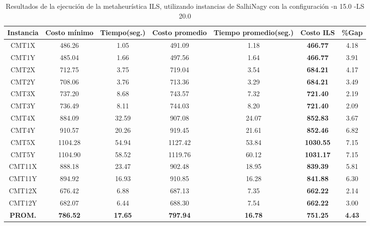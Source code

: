 \begin{table}[ht]
\caption{Resultados de la ejecución de la metaheurística ILS, utilizando instancias de SalhiNagy con la configuración -n 15.0 -LS 20.0}
\centering
\small
\begin{tabular}{c c c c c c c}
\hline\hline
Instancia & Costo mínimo & Tiempo(seg.) & Costo promedio & Tiempo promedio(seg.) & Costo ILS & \%Gap \\ [0.5ex]
\hline
CMT1X & 486.26 & 1.05 & 
491.09 & 1.18 & \bf{466.77} & 
4.18\\CMT1Y & 485.04 & 1.66 & 
497.56 & 1.64 & \bf{466.77} & 
3.91\\CMT2X & 712.75 & 3.75 & 
719.04 & 3.54 & \bf{684.21} & 
4.17\\CMT2Y & 708.06 & 3.76 & 
713.36 & 3.29 & \bf{684.21} & 
3.49\\CMT3X & 737.20 & 8.68 & 
743.57 & 7.32 & \bf{721.40} & 
2.19\\CMT3Y & 736.49 & 8.11 & 
744.03 & 8.20 & \bf{721.40} & 
2.09\\CMT4X & 884.09 & 32.59 & 
907.08 & 24.07 & \bf{852.83} & 
3.67\\CMT4Y & 910.57 & 20.26 & 
919.45 & 21.61 & \bf{852.46} & 
6.82\\CMT5X & 1104.28 & 54.94 & 
1127.42 & 53.84 & \bf{1030.55} & 
7.15\\CMT5Y & 1104.90 & 58.52 & 
1119.76 & 60.12 & \bf{1031.17} & 
7.15\\CMT11X & 888.18 & 23.47 & 
902.48 & 18.95 & \bf{839.39} & 
5.81\\CMT11Y & 894.92 & 16.93 & 
910.85 & 16.28 & \bf{841.88} & 
6.30\\CMT12X & 676.42 & 6.88 & 
687.13 & 7.35 & \bf{662.22} & 
2.14\\CMT12Y & 682.07 & 6.44 & 
688.30 & 7.54 & \bf{662.22} & 
3.00\\\bf{PROM.} & 
\bf{786.52} & \bf{17.65} & \bf{797.94} & \bf{16.78} & \bf{751.25} & \bf{4.43}\\[1ex]\hline
\end{tabular}
\label{table:nonlin}
\end{table} \clearpage
